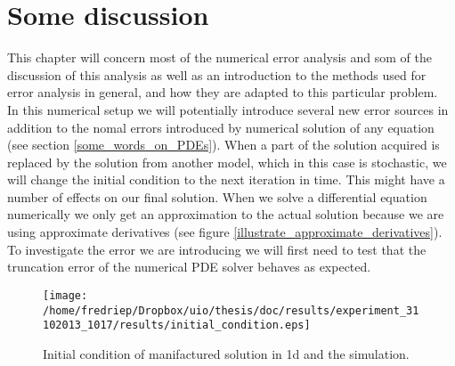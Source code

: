 \section{Some discussion}

This chapter will concern most of the numerical error analysis and som of the discussion of this analysis as well as an introduction to the methods used for error analysis in general, and how they are adapted to this particular problem.\\


In this numerical setup we will potentially introduce several new error sources in addition to the nomal errors introduced by numerical solution of any equation (see section \ref{some_words_on_PDEs}). 
When a part of the solution acquired is replaced by the solution from another model, which in this case is stochastic, we will change the initial condition to the next iteration in time. 
This might have a number of effects on our final solution. 
When we solve a differential equation numerically we only get an approximation to the actual solution because we are using approximate derivatives (see figure \ref{illustrate_approximate_derivatives}). 
To investigate the error we are introducing we will first need to test that the truncation error of the numerical PDE solver behaves as expected. 

\begin{figure}[H]
 \centering
 \texttt{[image: /home/fredriep/Dropbox/uio/thesis/doc/results/experiment\_31102013\_1017/results/initial\_condition.eps]}
 \caption[Initial condition in 1d]{Initial condition of manifactured solution in 1d and the simulation.}
 \label{initial_condition_1d}
\end{figure}


